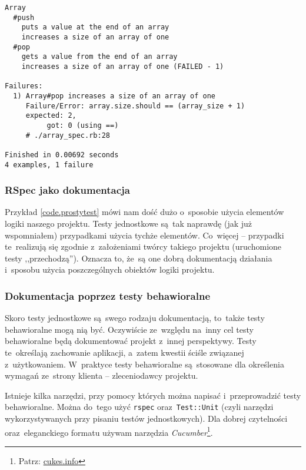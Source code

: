  \begin{lstlisting}
Array
  #push
    puts a value at the end of an array
    increases a size of an array of one
  #pop
    gets a value from the end of an array
    increases a size of an array of one (FAILED - 1)

Failures:
  1) Array#pop increases a size of an array of one
     Failure/Error: array.size.should == (array_size + 1)
     expected: 2,
          got: 0 (using ==)
     # ./array_spec.rb:28

Finished in 0.00692 seconds
4 examples, 1 failure
  \end{lstlisting}

\subsubsection{RSpec jako dokumentacja}


Przykład \ref{code.prostytest} mówi nam dość dużo o~sposobie użycia elementów logiki naszego projektu. Testy jednostkowe są~tak naprawdę (jak już wspomniałem) przypadkami użycia tychże elementów. Co~więcej -- przypadki te~realizują się zgodnie z~założeniami twórcy takiego projektu (uruchomione testy ,,przechodzą''). Oznacza to, że~są one dobrą dokumentacją działania i~sposobu użycia poszczególnych obiektów logiki projektu.

\subsubsection{Dokumentacja poprzez testy behawioralne} \label{dokumentacja.cucumber}

Skoro testy jednostkowe są~swego rodzaju dokumentacją, to~także testy behawioralne mogą nią być. Oczywiście ze~względu na~inny cel testy behawioralne będą dokumentować projekt z~innej perspektywy. Testy te~określają zachowanie aplikacji, a~zatem kwestii ściśle związanej z~użytkowaniem. W~praktyce testy behawioralne są~stosowane dla określenia wymagań ze~strony klienta -- zleceniodawcy projektu.


Istnieje kilka narzędzi, przy pomocy których można napisać i~przeprowadzić testy behawioralne. Można do~tego użyć \texttt{rspec} oraz~\texttt{Test::Unit} (czyli narzędzi wykorzystywanych przy pisaniu testów jednostkowych). Dla dobrej czytelności oraz~eleganckiego formatu używam narzędzia \textit{Cucumber}\footnote{Patrz: \url{cukes.info}}.

